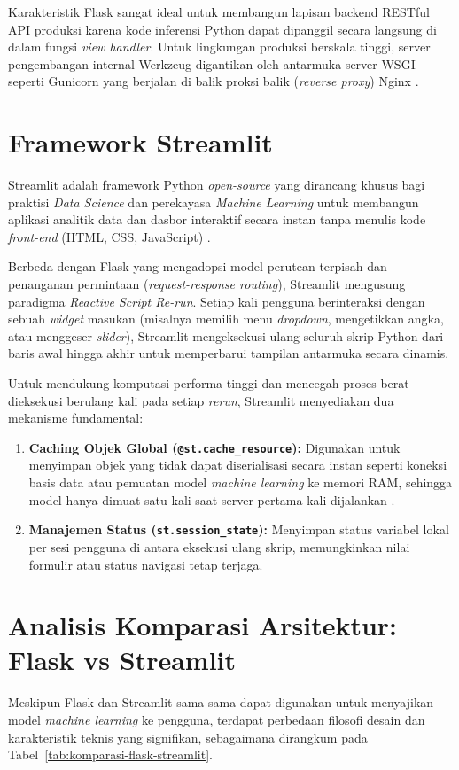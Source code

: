 \documentclass[a4paper,oneside,12pt]{report}
\begin{document}
Karakteristik Flask sangat ideal untuk membangun lapisan backend RESTful API produksi karena kode inferensi Python dapat dipanggil secara langsung di dalam fungsi \textit{view handler}. Untuk lingkungan produksi berskala tinggi, server pengembangan internal Werkzeug digantikan oleh antarmuka server WSGI seperti Gunicorn yang berjalan di balik proksi balik (\textit{reverse proxy}) Nginx \cite{flask-deploy}.

\section{Framework Streamlit}
Streamlit adalah framework Python \textit{open-source} yang dirancang khusus bagi praktisi \textit{Data Science} dan perekayasa \textit{Machine Learning} untuk membangun aplikasi analitik data dan dasbor interaktif secara instan tanpa menulis kode \textit{front-end} (HTML, CSS, JavaScript) \cite{streamlit-docs}.

Berbeda dengan Flask yang mengadopsi model perutean terpisah dan penanganan permintaan (\textit{request-response routing}), Streamlit mengusung paradigma \textit{Reactive Script Re-run}. Setiap kali pengguna berinteraksi dengan sebuah \textit{widget} masukan (misalnya memilih menu \textit{dropdown}, mengetikkan angka, atau menggeser \textit{slider}), Streamlit mengeksekusi ulang seluruh skrip Python dari baris awal hingga akhir untuk memperbarui tampilan antarmuka secara dinamis.

Untuk mendukung komputasi performa tinggi dan mencegah proses berat dieksekusi berulang kali pada setiap \textit{rerun}, Streamlit menyediakan dua mekanisme fundamental:
\begin{enumerate}[noitemsep, topsep=3pt, parsep=2pt]
	\item \textbf{Caching Objek Global (\texttt{@st.cache\_resource}):} Digunakan untuk menyimpan objek yang tidak dapat diserialisasi secara instan seperti koneksi basis data atau pemuatan model \textit{machine learning} ke memori RAM, sehingga model hanya dimuat satu kali saat server pertama kali dijalankan \cite{streamlit-caching}.
	\item \textbf{Manajemen Status (\texttt{st.session\_state}):} Menyimpan status variabel lokal per sesi pengguna di antara eksekusi ulang skrip, memungkinkan nilai formulir atau status navigasi tetap terjaga.
\end{enumerate}

\section{Analisis Komparasi Arsitektur: Flask vs Streamlit}
Meskipun Flask dan Streamlit sama-sama dapat digunakan untuk menyajikan model \textit{machine learning} ke pengguna, terdapat perbedaan filosofi desain dan karakteristik teknis yang signifikan, sebagaimana dirangkum pada Tabel~\ref{tab:komparasi-flask-streamlit}.
\end{document}
